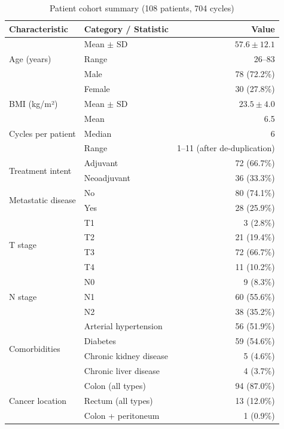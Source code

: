 \documentclass[12pt,a4paper]{report}
\begin{document}
\begin{table}[H]
\centering
\caption{Patient cohort summary (108 patients, 704 cycles)}
\label{tab:cohort}
\begin{tabular}{llr}
\toprule
\textbf{Characteristic} & \textbf{Category / Statistic} & \textbf{Value} \\
\midrule
\multirow{3}{*}{Age (years)} & Mean $\pm$ SD & $57.6 \pm 12.1$ \\
 & Range & 26--83 \\
\midrule
\multirow{2}{*}{Sex} & Male & 78 (72.2\%) \\
 & Female & 30 (27.8\%) \\
\midrule
BMI (kg/m²) & Mean $\pm$ SD & $23.5 \pm 4.0$ \\
\midrule
\multirow{3}{*}{Cycles per patient} & Mean & 6.5 \\
 & Median & 6 \\
 & Range & 1--11 (after de-duplication) \\
\midrule
\multirow{2}{*}{Treatment intent} & Adjuvant & 72 (66.7\%) \\
 & Neoadjuvant & 36 (33.3\%) \\
\midrule
\multirow{2}{*}{Metastatic disease} & No & 80 (74.1\%) \\
 & Yes & 28 (25.9\%) \\
\midrule
\multirow{4}{*}{T stage} & T1 & 3 (2.8\%) \\
 & T2 & 21 (19.4\%) \\
 & T3 & 72 (66.7\%) \\
 & T4 & 11 (10.2\%) \\
\midrule
\multirow{3}{*}{N stage} & N0 & 9 (8.3\%) \\
 & N1 & 60 (55.6\%) \\
 & N2 & 38 (35.2\%) \\
\midrule
\multirow{4}{*}{Comorbidities} & Arterial hypertension & 56 (51.9\%) \\
 & Diabetes & 59 (54.6\%) \\
 & Chronic kidney disease & 5 (4.6\%) \\
 & Chronic liver disease & 4 (3.7\%) \\
\midrule
\multirow{3}{*}{Cancer location} & Colon (all types) & 94 (87.0\%) \\
 & Rectum (all types) & 13 (12.0\%) \\
 & Colon + peritoneum & 1 (0.9\%) \\
\bottomrule
\end{tabular}
\end{table}
\end{document}
